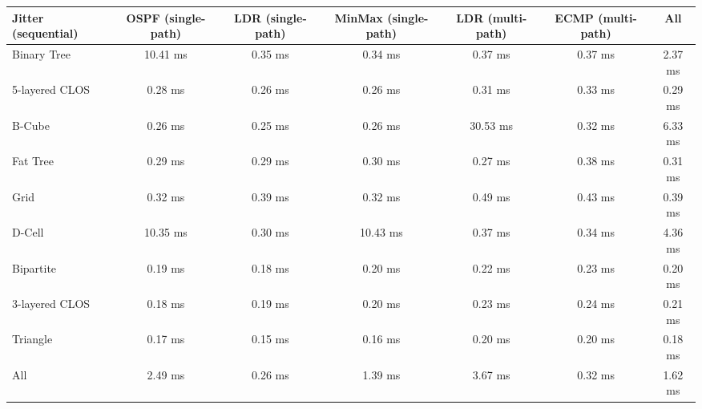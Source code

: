 \begin{tabular}{l|cccccc}
Jitter (sequential) & OSPF (single-path) & LDR (single-path) & MinMax (single-path) & LDR (multi-path) & ECMP (multi-path) & All     \\
\hline
Binary Tree         & 10.41 ms           & 0.35 ms           & 0.34 ms              & 0.37 ms          & 0.37 ms           & 2.37 ms \\
5-layered CLOS      & 0.28 ms            & 0.26 ms           & 0.26 ms              & 0.31 ms          & 0.33 ms           & 0.29 ms \\
B-Cube              & 0.26 ms            & 0.25 ms           & 0.26 ms              & 30.53 ms         & 0.32 ms           & 6.33 ms \\
Fat Tree            & 0.29 ms            & 0.29 ms           & 0.30 ms              & 0.27 ms          & 0.38 ms           & 0.31 ms \\
Grid                & 0.32 ms            & 0.39 ms           & 0.32 ms              & 0.49 ms          & 0.43 ms           & 0.39 ms \\
D-Cell              & 10.35 ms           & 0.30 ms           & 10.43 ms             & 0.37 ms          & 0.34 ms           & 4.36 ms \\
Bipartite           & 0.19 ms            & 0.18 ms           & 0.20 ms              & 0.22 ms          & 0.23 ms           & 0.20 ms \\
3-layered CLOS      & 0.18 ms            & 0.19 ms           & 0.20 ms              & 0.23 ms          & 0.24 ms           & 0.21 ms \\
Triangle            & 0.17 ms            & 0.15 ms           & 0.16 ms              & 0.20 ms          & 0.20 ms           & 0.18 ms \\
All                 & 2.49 ms            & 0.26 ms           & 1.39 ms              & 3.67 ms          & 0.32 ms           & 1.62 ms \\
\end{tabular}